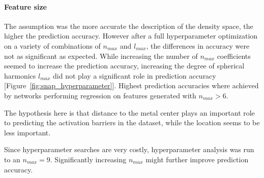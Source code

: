 \paragraph{Feature size}
The assumption was the more accurate the description of the density space, the higher the prediction accuracy.
However after a full hyperparameter optimization on a variety of combinations of $n_{max}$ and $l_{max}$,
the differences in accuracy were not as significant as expected.
While increasing the number of $n_{max}$ coefficients seemed to increase the prediction accuracy,
increasing the degree of spherical harmonics $l_{max}$ did not play a significant role in prediction accuracy [Figure~\ref{fig:snap_hyperparameter}].
Highest prediction accuracies where achieved by networks performing regression on features generated with $n_{max} > 6$.

The hypothesis here is that distance to the metal center plays an important role to predicting the activation
barriers in the dataset, while the location seems to be less important.

Since hyperparameter searches are very costly, hyperparameter analysis was run to an $n_{max} = 9$.
Significantly increasing $n_{max}$ might further improve prediction accuracy.

